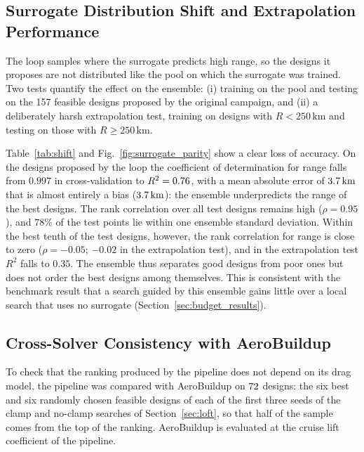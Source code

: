 \subsection{Surrogate Distribution Shift and Extrapolation Performance}
\label{sec:distribution_shift}
The loop samples where the surrogate predicts high range, so the designs it proposes are not distributed like the pool on which the surrogate was trained. Two tests quantify the effect on the ensemble: (i) training on the pool and testing on the 157 feasible designs proposed by the original campaign, and (ii) a deliberately harsh extrapolation test, training on designs with $R < 250\,\mathrm{km}$ and testing on those with $R \ge 250\,\mathrm{km}$.

Table~\ref{tab:shift} and Fig.~\ref{fig:surrogate_parity} show a clear loss of accuracy. On the designs proposed by the loop the coefficient of determination for range falls from $0.997$ in cross-validation to $R^2 = 0.76$, with a mean absolute error of $3.7\,\mathrm{km}$ that is almost entirely a bias ($3.7\,\mathrm{km}$): the ensemble underpredicts the range of the best designs. The rank correlation over all test designs remains high ($\rho = 0.95$), and $78\%$ of the test points lie within one ensemble standard deviation. Within the best tenth of the test designs, however, the rank correlation for range is close to zero ($\rho = -0.05$; $-0.02$ in the extrapolation test), and in the extrapolation test $R^2$ falls to $0.35$. The ensemble thus separates good designs from poor ones but does not order the best designs among themselves. This is consistent with the benchmark result that a search guided by this ensemble gains little over a local search that uses no surrogate (Section~\ref{sec:budget_results}).

\subsection{Cross-Solver Consistency with AeroBuildup}
\label{sec:aerobuildup_consistency}
\label{sec:validation}
To check that the ranking produced by the pipeline does not depend on its drag model, the pipeline was compared with AeroBuildup on $72$ designs: the six best and six randomly chosen feasible designs of each of the first three seeds of the clamp and no-clamp searches of Section~\ref{sec:loft}, so that half of the sample comes from the top of the ranking. AeroBuildup is evaluated at the cruise lift coefficient of the pipeline.

